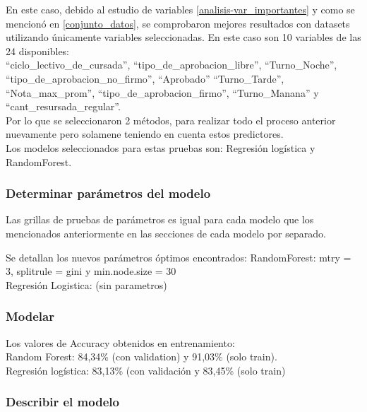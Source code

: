 En este caso, debido al estudio de variables \ref{analisis-var_importantes} y como se mencionó en \ref{conjunto_datos}, se comprobaron mejores resultados
con datasets utilizando únicamente variables seleccionadas. En este caso son 10 variables de las 24 disponibles:\\

``ciclo\_lectivo\_de\_cursada'', ``tipo\_de\_aprobacion\_libre'',
``Turno\_Noche'', ``tipo\_de\_aprobacion\_no\_firmo'', ``Aprobado''
``Turno\_Tarde'', ``Nota\_max\_prom'', ``tipo\_de\_aprobacion\_firmo'',
``Turno\_Manana'' y ``cant\_resursada\_regular''.\\


Por lo que se seleccionaron 2 métodos, para realizar todo el proceso
anterior nuevamente pero solamene teniendo en cuenta estos predictores.\\


Los modelos seleccionados para estas pruebas son: Regresión logística y
RandomForest.


\subsubsection{Determinar parámetros del modelo}

Las grillas de pruebas de parámetros es igual para cada modelo que los
mencionados anteriormente en las secciones de cada modelo por separado.

Se detallan los nuevos parámetros óptimos encontrados: 
RandomForest: mtry = 3, splitrule = gini y min.node.size = 30\\
Regresión Logistica: (sin parametros)

\subsubsection{Modelar}

Los valores de Accuracy obtenidos en entrenamiento:\\
Random Forest: 84,34\% (con validation) y 91,03\% (solo train).\\
Regresión logística: 83,13\% (con validación y 83,45\% (solo train)



\subsubsection{Describir el modelo}

